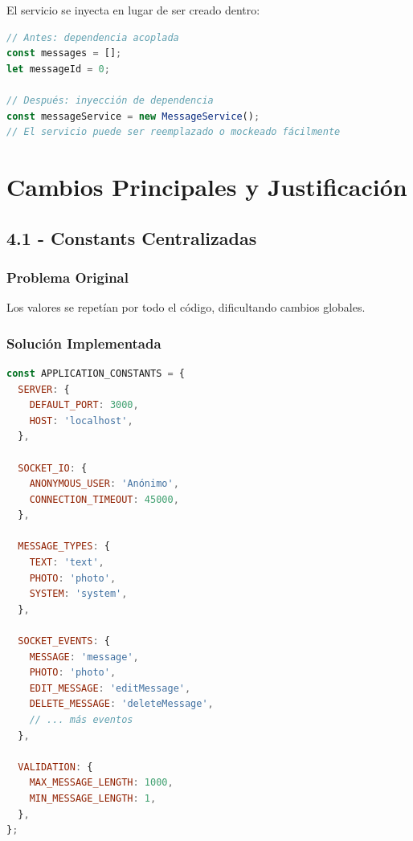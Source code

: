 \documentclass[12pt,a4paper]{article}
\begin{document}
El servicio se inyecta en lugar de ser creado dentro:

\begin{lstlisting}[caption=Inyección de Dependencias, language=JavaScript]
// Antes: dependencia acoplada
const messages = [];
let messageId = 0;

// Después: inyección de dependencia
const messageService = new MessageService();
// El servicio puede ser reemplazado o mockeado fácilmente
\end{lstlisting}

\newpage

\section{Cambios Principales y Justificación}

\subsection{4.1 - Constants Centralizadas}

\subsubsection{Problema Original}
Los valores se repetían por todo el código, dificultando cambios globales.

\subsubsection{Solución Implementada}

\begin{lstlisting}[caption=constants.js - Nuevos, language=JavaScript]
const APPLICATION_CONSTANTS = {
  SERVER: {
    DEFAULT_PORT: 3000,
    HOST: 'localhost',
  },
  
  SOCKET_IO: {
    ANONYMOUS_USER: 'Anónimo',
    CONNECTION_TIMEOUT: 45000,
  },
  
  MESSAGE_TYPES: {
    TEXT: 'text',
    PHOTO: 'photo',
    SYSTEM: 'system',
  },
  
  SOCKET_EVENTS: {
    MESSAGE: 'message',
    PHOTO: 'photo',
    EDIT_MESSAGE: 'editMessage',
    DELETE_MESSAGE: 'deleteMessage',
    // ... más eventos
  },
  
  VALIDATION: {
    MAX_MESSAGE_LENGTH: 1000,
    MIN_MESSAGE_LENGTH: 1,
  },
};
\end{lstlisting}
\end{document}
